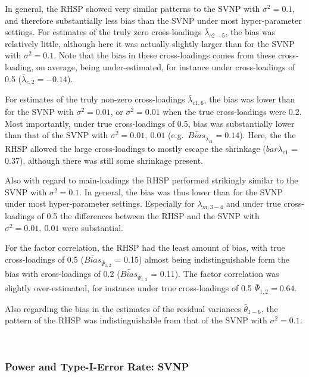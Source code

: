 \documentclass[
  man, donotrepeattitle,floatsintext]{apa6}
\begin{document}
In general, the RHSP showed very similar patterns to the SVNP with \(\sigma^2 = 0.1\), and therefore substantially less bias than the SVNP under most hyper-parameter settings. For estimates of the truly zero cross-loadings \(\bar{\lambda}_{c 2-5}\), the bias was relatively little, although here it was actually slightly larger than for the SVNP with \(\sigma^2 = 0.1\). Note that the bias in these cross-loadings comes from these cross-loading, on average, being under-estimated, for instance under cross-loadings of 0.5 (\(\bar{\lambda}_{c, 2} = -0.14\)).

For estimates of the truly non-zero cross-loadings \(\bar{\lambda}_{c1,6}\), the bias was lower than for the SVNP with \(\sigma^2 = 0.01\), or \(\sigma^2 = 0.01\) when the true cross-loadings were 0.2. Most importantly, under true cross-loadings of 0.5, bias was substantially lower than that of the SVNP with \(\sigma^2 = 0.01, \ 0.01\) (e.g.~\(\bar{Bias}_{\bar{\lambda}_{c 1}} = 0.14\)). Here, the the RHSP allowed the large cross-loadings to mostly escape the shrinkage (\(bar{\lambda}_{c 1}\) = 0.37), although there was still some shrinkage present.

Also with regard to main-loadings the RHSP performed strikingly similar to the SVNP with \(\sigma^2 = 0.1\). In general, the bias was thus lower than for the SVNP under most hyper-parameter settings. Especially for \(\lambda_{m,3-4}\) and under true cross-loadings of 0.5 the differences between the RHSP and the SVNP with \(\sigma^2 = 0.01, \ 0.01\) were substantial.

For the factor correlation, the RHSP had the least amount of bias, with true cross-loadings of 0.5 (\(\bar{Bias}_{\bar{\Psi}_{1,2}}\) = 0.15) almost being indistinguishable form the bias with cross-loadings of 0.2 (\(\bar{Bias}_{\bar{\Psi}_{1,2}}\) = 0.11). The factor correlation was slightly over-estimated, for instance under true cross-loadings of 0.5 \(\bar{\Psi}_{1,2} = 0.64\).

Also regarding the bias in the estimates of the residual variances \(\bar{\theta}_{1-6}\), the pattern of the RHSP was indistinguishable from that of the SVNP with \(\sigma^2 = 0.1\).

~

\hypertarget{power-and-type-i-error-rate-svnp}{%
\subsubsection{Power and Type-I-Error Rate: SVNP}\label{power-and-type-i-error-rate-svnp}}
\end{document}
